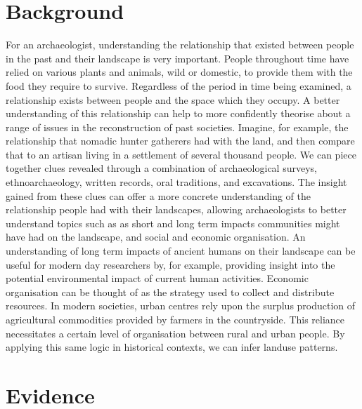 \section{Background} 

For an archaeologist, understanding the relationship that existed between
people in the past and their landscape is very important.  People throughout
time have relied on various plants and animals, wild or domestic, to provide
them with the food they require to survive.  Regardless of the period in time
being examined, a relationship exists between people and the space which they
occupy.  A better understanding of this relationship can help to more
confidently theorise about a range of issues in the reconstruction of past
societies.  Imagine, for example, the relationship that nomadic hunter
gatherers had with the land, and then compare that to  an artisan living in a
settlement of several thousand people.  We can piece together clues revealed
through a combination of archaeological surveys, ethnoarchaeology, written
records, oral traditions, and excavations. The insight gained from these clues
can offer a more concrete understanding of the relationship people had with
their landscapes, allowing archaeologists to better understand topics such as
as short and long term impacts communities might have had on the landscape, and
social and economic organisation. An understanding of long term impacts of
ancient humans on their landscape can be useful for modern day researchers by,
for example, providing insight into the potential environmental impact of 
current human activities. Economic organisation can be thought of as the 
strategy used to collect and distribute resources.  In modern societies, 
urban centres rely upon the surplus production of agricultural commodities 
provided by farmers in the countryside.  This reliance necessitates a certain 
level of organisation between rural and urban people.  By applying this same 
logic in historical contexts, we can infer landuse patterns. 

\section{Evidence} \label{sec:Evidence} 

